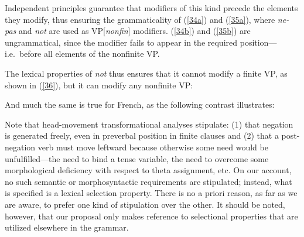 \documentclass[output=paper]{langsci/langscibook}
\begin{document}
\noindent Independent principles guarantee that modifiers of this
kind precede the elements they modify, thus ensuring the
grammaticality of (\ref{34a}) and (\ref{35a}), where {\it ne-pas} and {\it not} are used as VP[{\it nonfin}] modifiers.
(\ref{34b}) and (\ref{35b}) are ungrammatical, since
the modifier fails to appear in the required position---i.e.\
before all elements of the nonfinite VP.

The lexical properties of {\it not} thus ensures that it cannot
modify a finite VP, as shown in (\ref{36}), but it can modify any
nonfinite VP:

\be
\ex \label{36}\begin{xlist}
\end{xlist}
\ee




\noindent And much the same is true for French, as the
following contrast illustrates:

\be
\ex \begin{xlist}
\end{xlist}
\ee


Note that head-movement transformational analyses stipulate: (1) that negation
is generated freely, even in preverbal position in finite clauses and (2) that
a post-negation verb must move leftward because otherwise some need would be
unfulfilled---the need to bind a tense variable, the need to overcome some
morphological deficiency with respect to theta assignment, etc. On our
account, no such semantic or morphosyntactic requirements are stipulated;
instead, what is specified is a lexical selection property. There is no a
priori reason, as far as we are aware, to prefer one kind of stipulation over
the other. It should be noted, however, that our proposal only makes reference
to selectional properties that are utilized elsewhere in the grammar.
\end{document}
